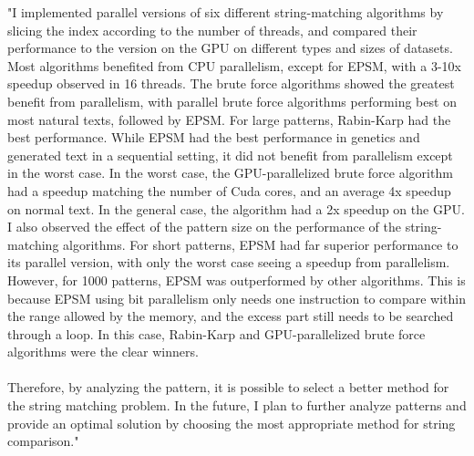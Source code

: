 \documentclass[11pt]{article}       %
\begin{document}
"I implemented parallel versions of six different string-matching algorithms by slicing the index according to the number of threads, and compared their performance to the version on the GPU on different types and sizes of datasets. Most algorithms benefited from CPU parallelism, except for EPSM, with a 3-10x speedup observed in 16 threads. The brute force algorithms showed the greatest benefit from parallelism, with parallel brute force algorithms performing best on most natural texts, followed by EPSM. For large patterns, Rabin-Karp had the best performance. While EPSM had the best performance in genetics and generated text in a sequential setting, it did not benefit from parallelism except in the worst case. In the worst case, the GPU-parallelized brute force algorithm had a speedup matching the number of Cuda cores, and an average 4x speedup on normal text. In the general case, the algorithm had a 2x speedup on the GPU. I also observed the effect of the pattern size on the performance of the string-matching algorithms. For short patterns, EPSM had far superior performance to its parallel version, with only the worst case seeing a speedup from parallelism. However, for 1000 patterns, EPSM was outperformed by other algorithms. This is because EPSM using bit parallelism only needs one instruction to compare within the range allowed by the memory, and the excess part still needs to be searched through a loop. In this case, Rabin-Karp and GPU-parallelized brute force algorithms were the clear winners. \\
\\Therefore, by analyzing the pattern, it is possible to select a better method for the string matching problem. In the future, I plan to further analyze patterns and provide an optimal solution by choosing the most appropriate method for string comparison."
\end{document}
